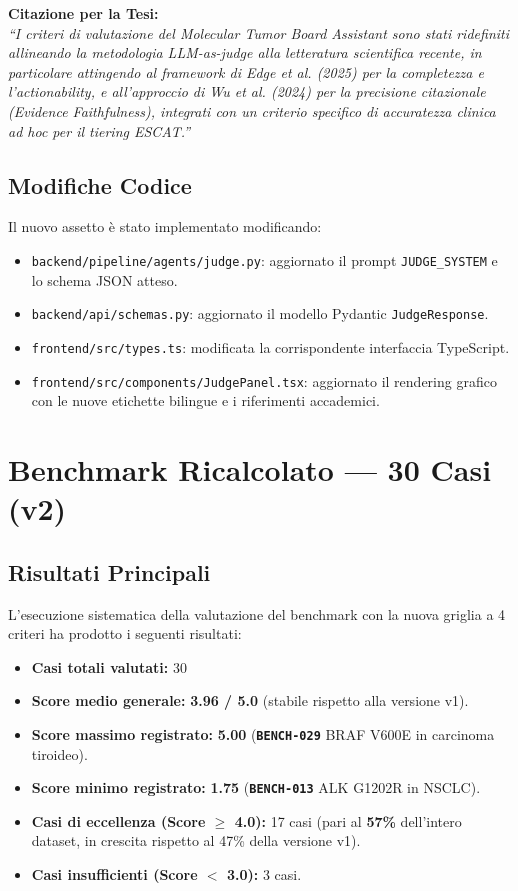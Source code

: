 \documentclass[12pt, a4paper]{article}
\newcommand{\bench}[1]{{\texttt{\textbf{#1}}}}
\begin{document}
\begin{insightbox}
\textbf{Citazione per la Tesi:}
\\
\textit{``I criteri di valutazione del Molecular Tumor Board Assistant sono stati ridefiniti allineando la metodologia LLM-as-judge alla letteratura scientifica recente, in particolare attingendo al framework di Edge et al. (2025) per la completezza e l'actionability, e all'approccio di Wu et al. (2024) per la precisione citazionale (Evidence Faithfulness), integrati con un criterio specifico di accuratezza clinica ad hoc per il tiering ESCAT.''}
\end{insightbox}

\subsection{Modifiche Codice}
Il nuovo assetto è stato implementato modificando:
\begin{itemize}[leftmargin=1.6em, itemsep=2pt]
  \item \texttt{backend/pipeline/agents/judge.py}: aggiornato il prompt \texttt{JUDGE\_SYSTEM} e lo schema JSON atteso.
  \item \texttt{backend/api/schemas.py}: aggiornato il modello Pydantic \texttt{JudgeResponse}.
  \item \texttt{frontend/src/types.ts}: modificata la corrispondente interfaccia TypeScript.
  \item \texttt{frontend/src/components/JudgePanel.tsx}: aggiornato il rendering grafico con le nuove etichette bilingue e i riferimenti accademici.
\end{itemize}

\section{Benchmark Ricalcolato --- 30 Casi (v2)}

\subsection{Risultati Principali}
L'esecuzione sistematica della valutazione del benchmark con la nuova griglia a 4 criteri ha prodotto i seguenti risultati:
\begin{itemize}[leftmargin=1.6em, itemsep=3pt]
  \item \textbf{Casi totali valutati:} 30
  \item \textbf{Score medio generale:} \textbf{3.96 / 5.0} (stabile rispetto alla versione v1).
  \item \textbf{Score massimo registrato:} \textbf{5.00} (\bench{BENCH-029} BRAF V600E in carcinoma tiroideo).
  \item \textbf{Score minimo registrato:} \textbf{1.75} (\bench{BENCH-013} ALK G1202R in NSCLC).
  \item \textbf{Casi di eccellenza (Score $\ge$ 4.0):} 17 casi (pari al \textbf{57\%} dell'intero dataset, in crescita rispetto al 47\% della versione v1).
  \item \textbf{Casi insufficienti (Score $<$ 3.0):} 3 casi.
\end{itemize}
\end{document}
